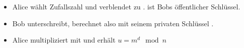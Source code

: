 \begin{itemize}
    \item
        Alice wählt Zufallszahl  und verblendet
         zu .  ist Bobs
        öffentlicher Schlüssel.
    \item
        Bob unterschreibt, berechnet also  mit seinem
        privaten Schlüssel .
    \item Alice multipliziert mit  und erhält $u=m^d \mod n$
\end{itemize}
